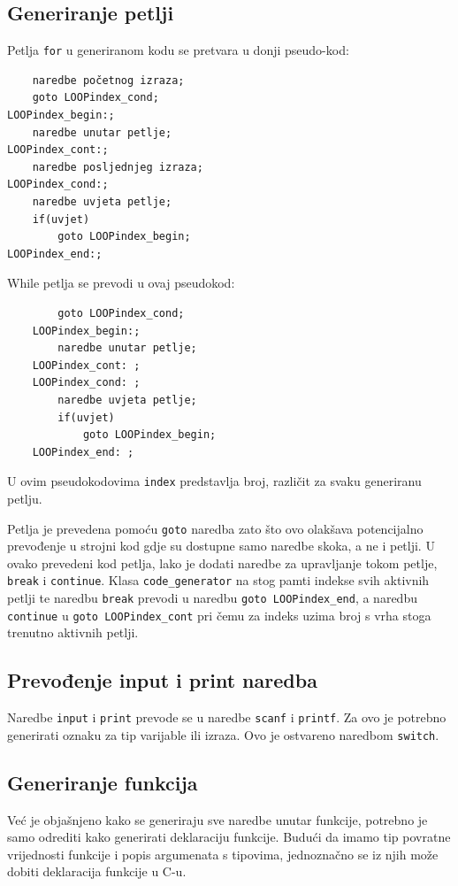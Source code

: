 \documentclass[times, utf8, zavrsni]{fer}
\begin{document}
\subsection{Generiranje petlji}
Petlja \verb|for| u generiranom kodu se pretvara u donji pseudo-kod:
\begin{verbatim}
    naredbe početnog izraza;
    goto LOOPindex_cond;
LOOPindex_begin:;
    naredbe unutar petlje;
LOOPindex_cont:;
    naredbe posljednjeg izraza;
LOOPindex_cond:;
    naredbe uvjeta petlje;
    if(uvjet)
        goto LOOPindex_begin;
LOOPindex_end:;
\end{verbatim}

While petlja se prevodi u ovaj pseudokod:
\begin{verbatim}
        goto LOOPindex_cond;
    LOOPindex_begin:;
        naredbe unutar petlje;
    LOOPindex_cont: ;
    LOOPindex_cond: ;
        naredbe uvjeta petlje;
        if(uvjet)
            goto LOOPindex_begin;
    LOOPindex_end: ;
\end{verbatim}

U ovim pseudokodovima \verb|index| predstavlja broj, različit za svaku generiranu petlju.

Petlja je prevedena pomoću \verb|goto| naredba zato što ovo olakšava potencijalno prevođenje u strojni kod
gdje su dostupne samo naredbe skoka, a ne i petlji.
U ovako prevedeni kod petlja, lako je dodati naredbe za upravljanje tokom petlje, \verb|break| i \verb|continue|.
Klasa \verb|code_generator| na stog pamti indekse svih aktivnih petlji te naredbu \verb|break| prevodi u naredbu
\verb|goto LOOPindex_end|, a naredbu \verb|continue| u \verb|goto LOOPindex_cont| pri čemu za indeks uzima broj
s vrha stoga trenutno aktivnih petlji.

\subsection{Prevođenje input i print naredba}
Naredbe \verb|input| i \verb|print| prevode se u naredbe \verb|scanf| i \verb|printf|. Za ovo je potrebno generirati
oznaku za tip varijable ili izraza. Ovo je ostvareno naredbom \verb|switch|.

\subsection{Generiranje funkcija}
Već je objašnjeno kako se generiraju sve naredbe unutar funkcije, potrebno je samo odrediti
kako generirati deklaraciju funkcije. Budući da imamo tip povratne vrijednosti funkcije i popis
argumenata s tipovima, jednoznačno se iz njih može dobiti deklaracija funkcije u C-u.
\end{document}
